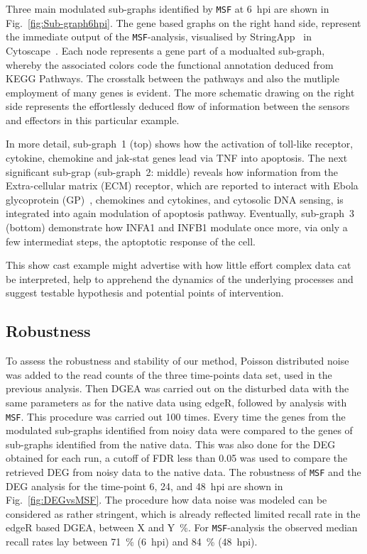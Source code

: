 \documentclass[10pt,a4paper,twocolumn]{article}
\newcommand{\TODO}[1]{\begingroup\color{red}#1\endgroup}
\begin{document}
 Three main modulated sub-graphs identified by \texttt{MSF} at 6~hpi are
 shown in Fig.~\ref{fig:Sub-graph6hpi}. The gene based graphs on the right
 hand side, represent the immediate output of the \texttt{MSF}-analysis,
 visualised by StringApp~\cite{StringApp} in Cytoscape~\cite{Cyto}. Each
 node represents a gene part of a modualted sub-graph, whereby the
 associated colors code the functional annotation deduced from KEGG
 Pathways. The crosstalk between the pathways and also the mutliple
 employment of many genes is evident. The more schematic drawing on the
 right side represents the effortlessly deduced flow of information between
 the sensors and effectors in this particular example.

 In more detail, sub-graph~1 (top) shows how the activation of toll-like
 receptor, cytokine, chemokine and jak-stat genes lead via TNF into
 apoptosis. The next significant sub-grap (sub-graph~2: middle) reveals how
 information from the Extra-cellular matrix (ECM) receptor, which are
 reported to interact with Ebola glycoprotein (GP)~\cite{Veljkovic},
 chemokines and cytokines, and cytosolic DNA sensing, is integrated into
 again modulation of apoptosis pathway. Eventually, sub-graph~3 (bottom)
 demonstrate how INFA1 and INFB1 modulate once more, via only a few
 intermediat steps, the aptoptotic response of the cell.

 This show cast example might advertise with how little effort complex data
 cat be interpreted, help to apprehend the dynamics of the underlying
 processes and suggest testable hypothesis and potential points of
 intervention.
 
 \subsection*{Robustness}
 
 To assess the robustness and stability of our method, Poisson distributed
 noise was added to the read counts of the three time-points data set, used
 in the previous analysis. Then DGEA was carried out on the disturbed data
 with the same parameters as for the native data using edgeR, followed by
 analysis with \texttt{MSF}. This procedure was carried out 100 times.
 Every time the genes from the modulated sub-graphs identified from noisy
 data were compared to the genes of sub-graphs identified from the native
 data. This was also done for the DEG obtained for each run, a cutoff of FDR less than 0.05 was used to compare the retrieved DEG from noisy data
 to the native data.  The robustness of \texttt{MSF} and the DEG analysis
 for the time-point 6, 24, and 48~hpi are shown in
 Fig.~\ref{fig:DEGvsMSF}. The procedure how data noise was modeled can be
 considered as rather stringent, which is already reflected limited recall
 rate in the edgeR based DGEA, between \TODO{X and Y~\%}. For
 \texttt{MSF}-analysis the observed median recall rates lay between 71~\%
 (6~hpi) and 84~\% (48~hpi).
\end{document}
